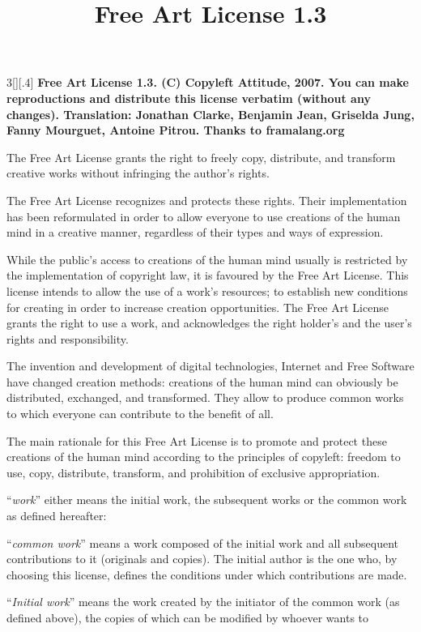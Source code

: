 \documentclass[8pt,a4paper]{article}
\title{Free Art License 1.3}
\newcommand\h[1]{\medskip{\fontfamily{ocr}\selectfont{\scalefont{.9}#1}}}
\begin{document}
%
%
\begin{multicols}{3}[][.4\paperwidth]%
{%
\textbf{%
Free Art License 1.3.
(C) Copyleft Attitude, 2007.
You can make reproductions and distribute this license verbatim
(without any changes).
Translation: Jonathan Clarke, Benjamin Jean, Griselda Jung, 
Fanny Mourguet, Antoine Pitrou.
Thanks to framalang.org
}}

\bigskip

\h{PREAMBLE}

The Free Art License grants the right to freely copy, distribute, and transform 
creative works without infringing the author's rights.

The Free Art License recognizes and protects these rights. Their implementation 
has been reformulated in order to allow everyone to use creations of the human 
mind in a creative manner, regardless of their types and ways of expression.

While the public's access to creations of the human mind usually is restricted 
by the implementation of copyright law, it is favoured by the Free Art License. 
This license intends to allow the use of a work’s resources; to establish new 
conditions for creating in order to increase creation opportunities. The Free 
Art License grants the right to use a work, and acknowledges the right 
holder’s and the user’s rights and responsibility.

The invention and development of digital technologies, Internet and Free 
Software have changed creation methods: creations of the human mind can 
obviously be distributed, exchanged, and transformed. They allow to produce 
common works to which everyone can contribute to the benefit of all.

The main rationale for this Free Art License is to promote and protect these 
creations of the human mind according to the principles of copyleft: freedom to 
use, copy, distribute, transform, and prohibition of exclusive appropriation. 


\h{DEFINITIONS}

``\emph{work}'' either means the initial work, the subsequent works or the 
common work as defined hereafter:

``\emph{common work}'' means a work composed of the initial work and all 
subsequent contributions to it (originals and copies). The initial author is 
the one who, by choosing this license, defines the conditions under which 
contributions are made.

``\emph{Initial work}'' means the work created by the initiator of the common 
work (as defined above), the copies of which can be modified by whoever wants to


\end{multicols}
\end{document}
